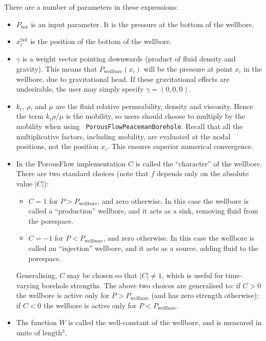 \documentclass[12pt]{report}
\begin{document}
There are a number of parameters in these expressions:
\begin{itemize}
\item $P_{\mathrm{bot}}$ is an input parameter.  It is the pressure at
  the bottom of the wellbore.
\item $x_{i}^{\mathrm{bot}}$ is the position of the bottom of the wellbore.
\item $\gamma$ is a weight vector pointing downwards (product of fluid
  density and gravity).  This means that
  $P_{\mathrm{wellbore}}(x_{i})$ will be the pressure at point $x_{i}$
  in the wellbore, due to gravitational head.  If these
  gravitational effects are undesirable, the user may simply specify
  $\gamma = (0,0,0)$.
\item $k_{\mathrm{r}}$, $\rho$, and $\mu$ are the fluid
  relative permeability, density and viscosity.  Hence the term
  $k_{\mathrm{r}}\rho/\mu$ is the mobility, so users should choose to
  multiply by the mobility when using {\tt
    PorousFlowPeacemanBorehole}.  Recall that all the multiplicative
  factors, including mobility, are evaluated at
  the nodal positions, not the position $x_{i}$.  This ensures
  superior numerical convergence.
\item In the PorousFlow implementation $C$ is called the ``character'' of
  the wellbore.   There are two standard choices (note that $f$ depends only on
  the absolute value $|C|$):
\begin{itemize}
\item $C=1$ for $P>P_{\mathrm{wellbore}}$, and zero otherwise.  In
  this case the wellbore is called a ``production'' wellbore, and it
  acts as a sink, removing fluid from the porespace.
\item $C=-1$ for $P<P_{\mathrm{wellbore}}$, and zero otherwise.  In
  this case the wellbore is called an ``injection'' wellbore, and it
  acts as a source, adding fluid to the porespace.
\end{itemize}
Generalising, $C$ may be chosen so that $|C|\neq 1$, which is useful for
time-varying borehole strengths.  The above two choices are
generalised to: if $C>0$ the wellbore is active only for
$P>P_{\mathrm{wellbore}}$ (and has zero strength otherwise); if $C<0$
the wellbore is active only for $P<P_{\mathrm{wellbore}}$.
\item The function $W$ is called the well-constant of the wellbore, and is
measured in units of length$^{3}$.
\end{itemize}
\end{document}
